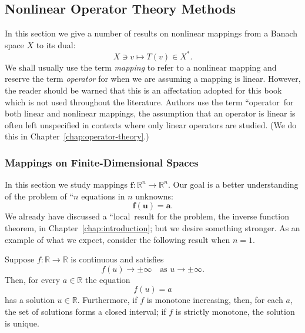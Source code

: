 \subsection{Nonlinear Operator Theory Methods}\label{sec:nonlinear-operator-theory-methods}

In this section we give a number of results on nonlinear mappings from a Banach space $X$ to its dual:
\begin{equation}\label{eq:nonlinear-banach-to-dual-mapping}
X\ni v\mapsto T(v)\in X^*.
\end{equation}
We shall usually use the term \emph{mapping} to refer to a nonlinear mapping and reserve the term \emph{operator} for when we are assuming a mapping is linear. However, the reader should be warned that this is an affectation adopted for this book which is not used throughout the literature. Authors use the term ``operator\textquotesingle\textquotesingle\ for both linear and nonlinear mappings, the assumption that an operator is linear is often left unspecified in contexts where only linear operators are studied. (We do this in Chapter~\ref{chap:operator-theory}.)

\subsubsection{Mappings on Finite-Dimensional Spaces}\label{subsec:finite-dimensional-nonlinear-mappings}

In this section we study mappings $\bm{f}:\mathbb{R}^n\to\mathbb{R}^n$. Our goal is a better understanding of the problem of ``$n$ equations in $n$ unknowns\textquotesingle\textquotesingle:
\begin{equation}\label{eq:finite-dimensional-nonlinear-system}
\bm{f}(\bm{u})=\bm{a}.
\end{equation}
We already have discussed a ``local\textquotesingle\textquotesingle\ result for the problem, the inverse function theorem, in Chapter~\ref{chap:introduction}; but we desire something stronger. As an example of what we expect, consider the following result when $n=1$.

\begin{Theorem}
\label{thm:scalar-continuous-monotone-surjectivity}
Suppose $f:\mathbb{R}\to\mathbb{R}$ is continuous and satisfies
\begin{equation}\label{eq:scalar-continuous-surjectivity-growth-condition}
f(u)\to\pm\infty\quad\text{as }u\to\pm\infty.
\end{equation}
Then, for every $a\in\mathbb{R}$ the equation
\begin{equation}\label{eq:scalar-continuous-surjectivity-equation}
f(u)=a
\end{equation}
has a solution $u\in\mathbb{R}$. Furthermore, if $f$ is monotone increasing, then, for each $a$, the set of solutions forms a closed interval; if $f$ is strictly monotone, the solution is unique.
\end{Theorem}

